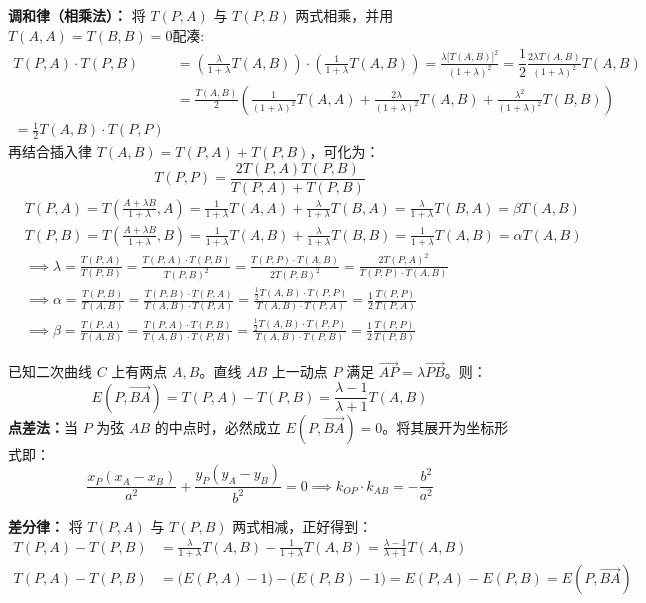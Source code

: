 \textbf{调和律（相乘法）：}
将 $T(P,A)$ 与 $T(P,B)$ 两式相乘，并用$T(A,A)=T(B,B)=0$配凑:
\begin{align*}
T(P,A) \cdot T(P,B) &= \left( \frac{\lambda}{1+\lambda} T(A,B) \right) \cdot \left( \frac{1}{1+\lambda} T(A,B) \right) = \frac{\lambda\big[T(A,B)\big]^2}{(1+\lambda)^2} =\dfrac12\frac{2\lambda T(A,B)}{(1+\lambda)^2} T(A,B)\\
&=\frac{T(A,B)}2\left(\frac{1}{(1+\lambda)^2} T(A,A) + \frac{2\lambda}{(1+\lambda)^2} T(A,B) + \frac{\lambda^2}{(1+\lambda)^2} T(B,B)\right)\\
\! =\frac12T(A,B)\cdot T(P,P)
\end{align*}
再结合插入律 $T(A,B) = T(P,A) + T(P,B)$，可化为：
$$ T(P,P) = \frac{2 T(P,A) T(P,B)}{T(P,A) + T(P,B)} $$
\begin{align*}
&T(P,A) = T(\frac{A+\lambda B}{1+\lambda},A)=\frac{1}{1+\lambda} T(A,A) +\frac{\lambda}{1+\lambda} T(B,A)=\frac{\lambda}{1+\lambda} T(B,A)=\beta T(A,B)\\
&T(P,B) =T(\frac{A+\lambda B}{1+\lambda},B)=\frac{1}{1+\lambda} T(A,B) +\frac{\lambda}{1+\lambda} T(B,B)=\frac{1}{1+\lambda} T(A,B)=\alpha T(A,B)\\
&\implies\lambda = \frac{T(P,A)}{T(P,B)}=\frac{T(P,A)\cdot T(P,B)}{T(P,B)^2}=\frac{T(P,P)\cdot T(A,B)}{2T(P,B)^2}=\frac{2T(P,A)^2}{T(P,P)\cdot T(A,B)}\\
&\implies\alpha=\frac{T(P,B)}{T(A,B)}=\frac{T(P,B)\cdot T(P,A)}{T(A,B)\cdot T(P,A)}=\frac{\frac12T(A,B)\cdot T(P,P)}{T(A,B)\cdot T(P,A)}=\frac12\frac{T(P,P)}{T(P,A)}\\
&\implies\beta=\frac{T(P,A)}{T(A,B)}=\frac{T(P,A)\cdot T(P,B)}{T(A,B)\cdot T(P,B)}=\frac{\frac12T(A,B)\cdot T(P,P)}{T(A,B)\cdot T(P,B)}=\frac12\frac{T(P,P)}{T(P,B)}
\end{align*}

\begin{conclusion}
已知二次曲线 $C$ 上有两点 $A, B$。直线 $AB$ 上一动点 $P$ 满足 $\overrightarrow{AP} = \lambda \overrightarrow{PB}$。则：
$$ E(P, \overrightarrow{BA}) = T(P,A) - T(P,B) = \frac{\lambda - 1}{\lambda + 1} T(A,B) $$
\textbf{点差法：}当 $P$ 为弦 $AB$ 的中点时，必然成立 $E(P, \overrightarrow{BA}) = 0$。将其展开为坐标形式即：
$$ \frac{x_P(x_A-x_B)}{a^2} + \frac{y_P(y_A-y_B)}{b^2} = 0 \implies k_{OP} \cdot k_{AB} = -\frac{b^2}{a^2} $$
\end{conclusion}

\textbf{差分律：}
将 $T(P,A)$ 与 $T(P,B)$ 两式相减，正好得到：
\begin{align*}
T(P,A) - T(P,B) &= \frac{\lambda}{1+\lambda} T(A,B) - \frac{1}{1+\lambda} T(A,B) = \frac{\lambda - 1}{\lambda + 1} T(A,B)\\
T(P,A) - T(P,B) &= \big(E(P,A) - 1\big) - \big(E(P,B) - 1\big) = E(P,A) - E(P,B)=E(P, \overrightarrow{BA})
\end{align*}

